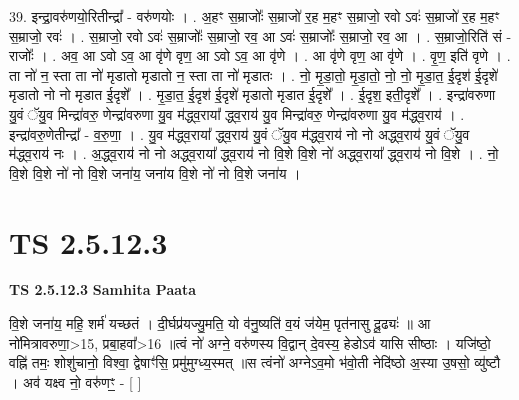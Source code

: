\documentclass[17pt]{extarticle}
\begin{document}
39. इन्द्रा॒वरु॑णयो॒रितीन्द्रा᳚ - वरु॑णयोः । . अ॒हꣳ स॒म्राजोः᳚ स॒म्राजो॑ र॒ह म॒हꣳ स॒म्राजो॒ रवो ऽवः॑ स॒म्राजो॑ र॒ह म॒हꣳ स॒म्राजो॒ रवः॑ । . स॒म्राजो॒ रवो ऽवः॑ स॒म्राजोः᳚ स॒म्राजो॒ रव॒ आ ऽवः॑ स॒म्राजोः᳚ स॒म्राजो॒ रव॒ आ । . स॒म्राजो॒रिति॑ सं - राजोः᳚ । . अव॒ आ ऽवो ऽव॒ आ वृ॑णे वृण॒ आ ऽवो ऽव॒ आ वृ॑णे । . आ वृ॑णे वृण॒ आ वृ॑णे । . वृ॒ण॒ इति॑ वृणे । . ता नो॑ न॒ स्ता ता नो॑ मृडातो मृडातो न॒ स्ता ता नो॑ मृडातः । . नो॒ मृ॒डा॒तो॒ मृ॒डा॒तो॒ नो॒ नो॒ मृ॒डा॒त॒ ई॒दृश॑ ई॒दृशे॑ मृडातो नो नो मृडात ई॒दृशे᳚ । . मृ॒डा॒त॒ ई॒दृश॑ ई॒दृशे॑ मृडातो मृडात ई॒दृशे᳚ । . ई॒दृश॒ इती॒दृशे᳚ । . इन्द्रा॑वरुणा यु॒वं ॅयु॒व मिन्द्रा॑वरु॒ णेन्द्रा॑वरुणा यु॒व म॑द्ध्व॒राया᳚ द्ध्व॒राय॑ यु॒व मिन्द्रा॑वरु॒ णेन्द्रा॑वरुणा यु॒व म॑द्ध्व॒राय॑ । . इन्द्रा॑वरु॒णेतीन्द्रा᳚ - व॒रु॒णा॒ । . यु॒व म॑द्ध्व॒राया᳚ द्ध्व॒राय॑ यु॒वं ॅयु॒व म॑द्ध्व॒राय॑ नो नो अद्ध्व॒राय॑ यु॒वं ॅयु॒व म॑द्ध्व॒राय॑ नः । . अ॒द्ध्व॒राय॑ नो नो अद्ध्व॒राया᳚ द्ध्व॒राय॑ नो वि॒शे वि॒शे नो॑ अद्ध्व॒राया᳚ द्ध्व॒राय॑ नो वि॒शे । . नो॒ वि॒शे वि॒शे नो॑ नो वि॒शे जना॑य॒ जना॑य वि॒शे नो॑ नो वि॒शे जना॑य । \newline
\pagebreak
{}
\section*{ TS 2.5.12.3 }

\textbf{TS 2.5.12.3 } \newline
\textbf{Samhita Paata} \newline

वि॒शे जना॑य॒ महि॒ शर्म॑ यच्छतं । दी॒र्घप्र॑यज्यु॒मति॒ यो व॑नु॒ष्यति॑ व॒यं ज॑येम॒ पृत॑नासु दू॒ढ्यः॑ ॥ आ नो॑मित्रावरुणा॒>15, प्रबा॒हवा᳚>16 ॥त्वं नो॑ अग्ने॒ वरु॑णस्य वि॒द्वान् दे॒वस्य॒ हेडोऽव॑ यासि सीष्ठाः । यजि॑ष्ठो॒ वह्नि॑ तमः॒ शोशु॑चानो॒ विश्वा॒ द्वेषाꣳ॑सि॒ प्रमु॑मुग्ध्य॒स्मत् ॥स त्वंनो॑ अग्नेऽव॒मो भ॑वो॒ती नेदि॑ष्ठो अ॒स्या उ॒षसो॒ व्यु॑ष्टौ । अव॑ यक्ष्व नो॒ वरु॑णꣳ॒॒ - [  ] \newline
\end{document}
